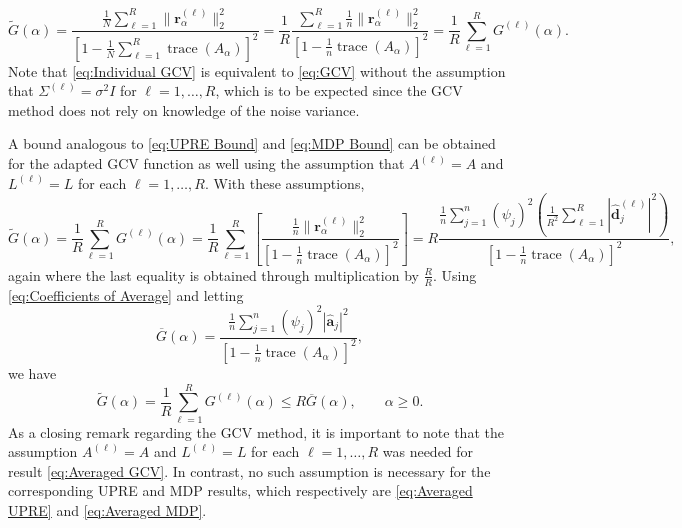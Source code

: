 \documentclass[12pt]{article}
\newcommand{\aVec}{\mathbf{a}}	%
\newcommand{\dVec}{\mathbf{d}}	%
\DeclareMathOperator{\trace}{trace}		%
\newcommand{\dft}[1]{\widehat{#1}}	%
\newcommand{\regparam}{\alpha}
\newcommand{\mfilt}{\psi}
\newcommand{\noiseSD}{\sigma}	%
\newcommand{\regres}{\mathbf{r}_{\regparam}}	%
\newcommand{\A}{A_{\regparam}}	%
\newcommand{\G}{G}	%
\begin{document}
\begin{equation}
\label{eq:Averaged GCV}
\widetilde{\G}(\regparam) = \frac{\frac{1}{N}\sum_{\ell=1}^R \|\regres^{(\ell)}\|_2^2}{\left[1 - \frac{1}{N}\sum_{\ell=1}^R \trace\left(\A\right)\right]^2} = \frac{1}{R}\frac{\sum_{\ell=1}^R \frac{1}{n} \|\regres^{(\ell)}\|_2^2}{\left[1 - \frac{1}{n} \trace\left(\A\right)\right]^2} = \frac{1}{R}\sum_{\ell=1}^R \G^{(\ell)}(\regparam).
\end{equation}
Note that \eqref{eq:Individual GCV} is equivalent to \eqref{eq:GCV} without the assumption that $\Sigma^{(\ell)} = \noiseSD^2 I$ for $\ell = 1,\ldots,R$, which is to be expected since the GCV method does not rely on knowledge of the noise variance. \par 
A bound analogous to \eqref{eq:UPRE Bound} and \eqref{eq:MDP Bound} can be obtained for the adapted GCV function as well using the assumption that $A^{(\ell)} = A$ and $L^{(\ell)} = L$ for each $\ell = 1,\ldots,R$. With these assumptions,
\[\widetilde{\G}(\regparam) = \frac{1}{R} \sum_{\ell=1}^R \G^{(\ell)}(\regparam) = \frac{1}{R}\sum_{\ell=1}^R \left[\frac{\frac{1}{n}\|\regres^{(\ell)}\|_2^2}{\left[1 - \frac{1}{n}\trace\left(\A\right)\right]^2}\right]  = R\frac{\frac{1}{n}\sum_{j=1}^{n} \left(\mfilt_j\right)^2\left(\frac{1}{R^2} \sum_{\ell=1}^R |\dft{\dVec}_j^{(\ell)}|^2\right)}{\left[1 - \frac{1}{n}\trace\left(\A\right)\right]^2},\]
again where the last equality is obtained through multiplication by $\frac{R}{R}$. Using \eqref{eq:Coefficients of Average} and letting
\[\overline{\G}(\regparam) = \frac{\frac{1}{n}\sum_{j=1}^{n} \left(\mfilt_j\right)^2|\dft{\aVec}_j|^2}{\left[1 - \frac{1}{n}\trace\left(\A\right)\right]^2},\]
we have
\begin{equation}
\label{eq:GCV Bound}
\widetilde{\G}(\regparam) = \frac{1}{R} \sum_{\ell=1}^R \G^{(\ell)}(\regparam) \leq R \overline{\G}(\regparam), \qquad \regparam \geq 0.
\end{equation}
As a closing remark regarding the GCV method, it is important to note that the assumption $A^{(\ell)} = A$ and $L^{(\ell)} = L$ for each $\ell = 1,\ldots,R$ was needed for result \eqref{eq:Averaged GCV}. In contrast, no such assumption is necessary for the corresponding UPRE and MDP results, which respectively are \eqref{eq:Averaged UPRE} and \eqref{eq:Averaged MDP}.
\end{document}
